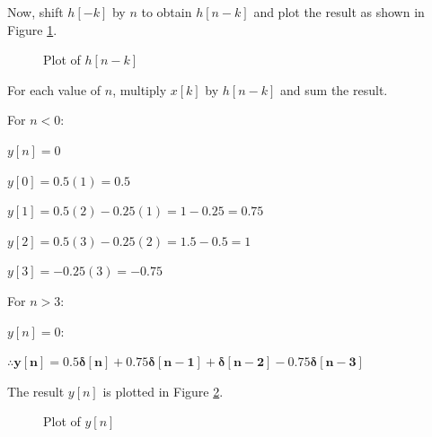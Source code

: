 \documentclass[fleqn]{article}
\begin{document}
\begin{enumerate}
		Now, shift $h[-k]$ by $n$ to obtain $h[n-k]$ and plot the result as shown in Figure \ref{prob1_hn-k_plot}.
		
		\begin{figure}[H]				
			\centerline{}
			\caption{Plot of $h[n-k]$}
			\label{prob1_hn-k_plot}
		\end{figure}
		
		For each value of $n$, multiply $x[k]$ by $h[n-k]$ and sum the result.
		
		For $n < 0$:
		
		$y[n] = 0$
		
		$y[0] = 0.5(1) = 0.5$
		
		$y[1] = 0.5(2) - 0.25(1) = 1 - 0.25 = 0.75$
		
		$y[2] = 0.5(3) - 0.25(2) = 1.5 - 0.5 = 1$
		
		$y[3] = -0.25(3) = -0.75$
		
		For $n > 3$:
		
		$y[n] = 0$:
		
		$\mathbf{\therefore y[n] = 0.5\delta[n] + 0.75\delta[n-1] + \delta[n-2] - 0.75\delta[n-3]}$
		
		The result $y[n]$ is plotted in Figure \ref{prob1_yn_plot}.
		
		\begin{figure}[H]				
			\centerline{}
			\caption{Plot of $y[n]$}
			\label{prob1_yn_plot}
		\end{figure}
		

\end{enumerate}
\end{document}
